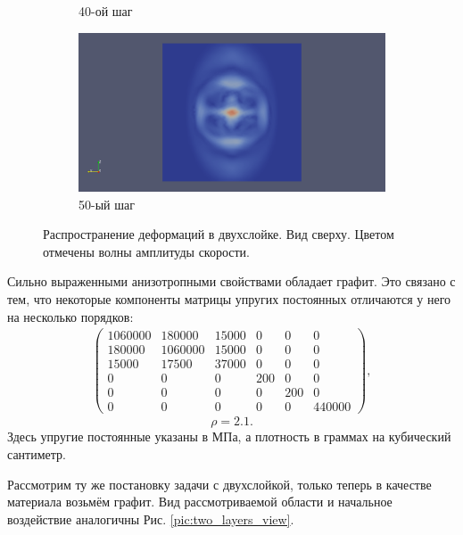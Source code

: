 \begin{figure}[H]
\begin{subfigure}[b]{0.5\textwidth}
\caption{40-ой шаг}
\end{subfigure}
\begin{subfigure}[b]{0.5\textwidth}
\centering
\includegraphics[width=1.0\textwidth]{png/two-layers/slice_50.png}
\caption{50-ый шаг}
\end{subfigure}
\caption{Распространение деформаций в двухслойке. Вид сверху. Цветом отмечены волны амплитуды скорости.}
\label{pic:two_layers_top}
\end{figure}

	Сильно выраженными анизотропными свойствами обладает графит.
	Это связано с тем, что некоторые компоненты матрицы упругих постоянных отличаются у него на несколько порядков:
\begin{align}
\label{graphite_mat}
\left( \begin{array}{cccccccccccc}
1060000 & 180000 & 15000 & 0 & 0 & 0 \\ 
180000 & 1060000 & 15000 & 0 & 0 & 0 \\ 
15000 & 17500 & 37000 & 0 & 0 & 0 \\ 
0 & 0 & 0 & 200 & 0 & 0 \\ 
0 & 0 & 0 & 0 & 200 & 0 \\ 
0 & 0 & 0 & 0 & 0 & 440000
\end{array} \right),
\end{align}	
\begin{equation}
	\rho = 2.1.
\end{equation}
	Здесь упругие постоянные указаны в МПа, а плотность в граммах на кубический сантиметр.
	
	Рассмотрим ту же постановку задачи с двухслойкой, только теперь в качестве материала возьмём графит.
	Вид рассмотриваемой области и начальное воздействие аналогичны Рис. \ref{pic:two_layers_view}.
	
